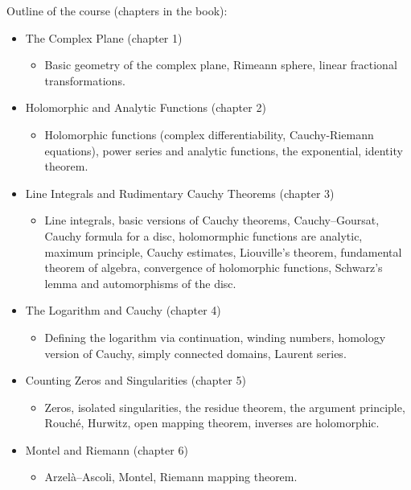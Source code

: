 \documentclass[10pt,aspectratio=169]{beamer}
\begin{document}
\begin{frame}
Outline of the course (chapters in the book):

\begin{itemize}
\item
The Complex Plane (chapter 1)
\begin{itemize}
\item Basic geometry of the complex plane,
Rimeann sphere,
linear fractional transformations.
\end{itemize}

\pause
\item Holomorphic and Analytic Functions (chapter 2)
\begin{itemize}
\item
Holomorphic functions (complex differentiability, Cauchy-Riemann equations),
power series and analytic functions, the exponential, identity theorem.
\end{itemize}

\pause
\item Line Integrals and Rudimentary Cauchy Theorems (chapter 3)
\begin{itemize}
\item
Line integrals, basic versions of Cauchy theorems, Cauchy--Goursat,
Cauchy formula for a disc,
holomormphic functions are analytic,
maximum principle,
Cauchy estimates,
Liouville's theorem,
fundamental theorem of algebra,
convergence of holomorphic functions,
Schwarz's lemma and automorphisms of the disc.
\end{itemize}

\pause
\item The Logarithm and Cauchy (chapter 4)
\begin{itemize}
\item
Defining the logarithm via continuation,
winding numbers, homology version of Cauchy,
simply connected domains,
Laurent series.
\end{itemize}

\pause
\item Counting Zeros and Singularities (chapter 5)
\begin{itemize}
\item
Zeros, isolated singularities, the residue theorem,
the argument principle,
Rouch\'e, Hurwitz,
open mapping theorem, inverses are holomorphic.
\end{itemize}

\pause
\item Montel and Riemann (chapter 6)
\begin{itemize}
\item
Arzel\`a--Ascoli, Montel, Riemann mapping theorem.
\end{itemize}

\end{itemize}
\end{frame}
\end{document}
